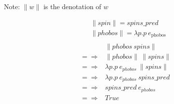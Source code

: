\documentclass[logoontitle,tabu,supertabular,aspectratio=43]{preney-uwindsor-beamer}
\newcommand{\phobos}{\mathit{phobos}}
\newcommand{\spins}{\mathit{spins}}
\newcommand{\spin}{\mathit{spin}}
\newcommand{\meaningof}[1]{\lVert #1 \rVert}
\newcommand{\entityassoc}[1]{e_{#1}}
\newcommand{\wordpred}[1]{\mathit{#1\_pred}}
\newcommand{\True}{\mathit{True}}
\begin{document}
    \begin{frame}{\insertsubsection}
        \centering
        Note: $\meaningof{w}$ is the denotation of $w$

        \begin{equation*}
            \begin{split}
                &\meaningof{\spin} = \wordpred{\spins} \\
                &\meaningof{\phobos} = \lambda p. p\ e_\mathrm{phobos} \\
            \end{split}
        \end{equation*}
        \begin{equation*}
            \begin{split}
                & \meaningof{\phobos \ \spins} \\
                =\!\Rightarrow&  \meaningof{\phobos}\ \meaningof{\spins} \\
                =\!\Rightarrow&  \lambda p. p \ \entityassoc{phobos} \ \meaningof{\spins} \\
                =\!\Rightarrow&  \lambda p. p \ \entityassoc{phobos} \ \wordpred{\spins}\\
                =\!\Rightarrow&  \wordpred{\spins} \ \entityassoc{phobos} \\
                =\!\Rightarrow&  \True
            \end{split}
        \end{equation*}

    \end{frame}
\end{document}
